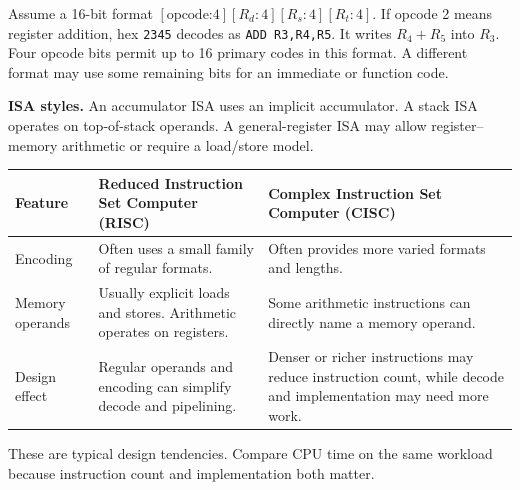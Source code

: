 \documentclass[12pt,a4paper]{article}
\begin{document}
\begin{tcolorbox}[examplebox,title={Read a toy instruction code}]
Assume a 16-bit format $[\text{opcode:4}][R_d:4][R_s:4][R_t:4]$. If opcode 2 means register addition, hex \texttt{2345} decodes as \texttt{ADD R3,R4,R5}. It writes $R_4+R_5$ into $R_3$. Four opcode bits permit up to 16 primary codes in this format. A different format may use some remaining bits for an immediate or function code.
\end{tcolorbox}
\textbf{ISA styles.} An accumulator ISA uses an implicit accumulator. A stack ISA operates on top-of-stack operands. A general-register ISA may allow register--memory arithmetic or require a load/store model.
\par\vspace{6pt}\noindent
\begin{tabularx}{\linewidth}{|B{2.6cm}|Y|Y|}\hline
Feature & Reduced Instruction Set Computer (RISC) & Complex Instruction Set Computer (CISC) \\ \hline
Encoding & Often uses a small family of regular formats. & Often provides more varied formats and lengths. \\ \hline
Memory operands & Usually explicit loads and stores. Arithmetic operates on registers. & Some arithmetic instructions can directly name a memory operand. \\ \hline
Design effect & Regular operands and encoding can simplify decode and pipelining. & Denser or richer instructions may reduce instruction count, while decode and implementation may need more work. \\ \hline
\end{tabularx}

These are typical design tendencies. Compare CPU time on the same workload because instruction count and implementation both matter.
\end{document}
